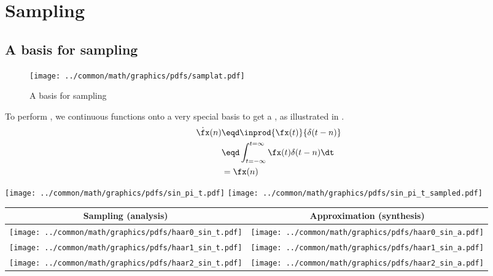 ﻿%
\chapter{Sampling}
\label{chp:sampling}

\section{A basis for sampling}
\begin{figure}[h]
  \centering
  \texttt{[image: ../common/math/graphics/pdfs/samplat.pdf]}
\caption{A basis for sampling \label{fig:samplat}}
\end{figure}
  To perform , we  
  continuous functions onto a very special basis
  to get a , as illustrated in .
\begin{align*}
  \dot{\fx}(n)
    &\eqd \inprod{\fx(t)}{\delta(t-n)}
  \\&\eqd \int_{t=-\infty}^{t=\infty} \fx(t)\delta(t-n) \dt
  \\&=    \fx(n)
\end{align*}


\texttt{[image: ../common/math/graphics/pdfs/sin\_pi\_t.pdf]}
\texttt{[image: ../common/math/graphics/pdfs/sin\_pi\_t\_sampled.pdf]}


  \begin{tabular}{|c|c|}
    \hline
    Sampling (analysis) & Approximation (synthesis)
    \\\hline\hline
      \texttt{[image: ../common/math/graphics/pdfs/haar0\_sin\_t.pdf]}
    & \texttt{[image: ../common/math/graphics/pdfs/haar0\_sin\_a.pdf]}
    \\\hline
      \texttt{[image: ../common/math/graphics/pdfs/haar1\_sin\_t.pdf]}
    & \texttt{[image: ../common/math/graphics/pdfs/haar1\_sin\_a.pdf]}
    \\\hline
      \texttt{[image: ../common/math/graphics/pdfs/haar2\_sin\_t.pdf]}
    & \texttt{[image: ../common/math/graphics/pdfs/haar2\_sin\_a.pdf]}
    \\\hline
  \end{tabular}

